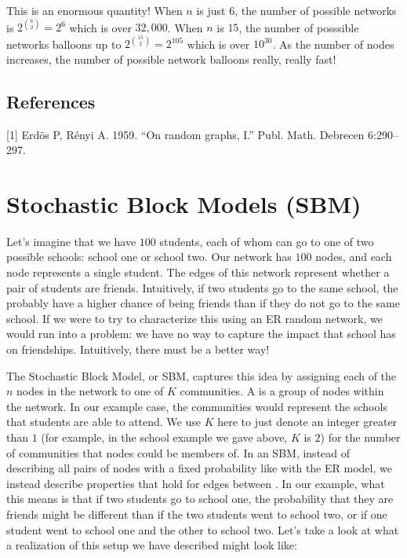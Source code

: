 \documentclass[letterpaper,10pt,english]{jupyterBook}
\begin{document}
\noindent{}

\sphinxAtStartPar
This is an enormous quantity! When \(n\) is just \(6\), the number of possible networks is \(2^{\binom 6 2} = 2^{6}\) which is over \(32,000\). When \(n\) is \(15\), the number of posssible networks balloons up to \(2^{\binom{15}{2}} = 2^{105}\) which is over \(10^{30}\). As the number of nodes increases, the number of possible network balloons really, really fast!


\subsection{References}
\label{\detokenize{representations/ch5/single-network-models_ER:references}}
\sphinxAtStartPar
{[}1{]} Erdös P, Rényi A. 1959. “On random graphs, I.” Publ. Math. Debrecen 6:290–297.


\section{Stochastic Block Models (SBM)}
\label{\detokenize{representations/ch5/single-network-models_SBM:stochastic-block-models-sbm}}\label{\detokenize{representations/ch5/single-network-models_SBM::doc}}
\sphinxAtStartPar
Let’s imagine that we have \(100\) students, each of whom can go to one of two possible schools: school one or school two. Our network has \(100\) nodes, and each node represents a single student. The edges of this network represent whether a pair of students are friends. Intuitively, if two students go to the same school, the probably have a higher chance of being friends than if they do not go to the same school. If we were to try to characterize this using an ER random network, we would run into a problem: we have no way to capture the impact that school has on friendships. Intuitively, there must be a better way!

\sphinxAtStartPar
The Stochastic Block Model, or SBM, captures this idea by assigning each of the \(n\) nodes in the network to one of \(K\) communities. A  is a group of nodes within the network. In our example case, the communities would represent the schools that students are able to attend. We use \(K\) here to just denote an integer greater than \(1\) (for example, in the school example we gave above, \(K\) is \(2\)) for the number of  communities that nodes could be members of. In an SBM, instead of describing all pairs of nodes with a fixed probability like with the ER model, we instead describe properties that hold for edges between . In our example, what this means is that if two students go to school one, the probability that they are friends might be different than if the two students went to school two, or if one student went to school one and the other to school two. Let’s take a look at what a realization of this setup we have described might look like:
\end{document}
